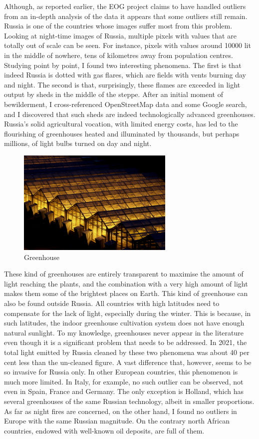 Although, as reported earlier, the EOG project claims to have handled outliers from an in-depth analysis of the data it appears that some outliers still remain. Russia is one of the countries whose images suffer most from this problem. Looking at night-time images of Russia, multiple pixels with values that are totally out of scale can be seen. For instance, pixels with values around 10000 lit in the middle of nowhere, tens of kilometres away from population centres.
Studying point by point, I found two interesting phenomena. The first is that indeed Russia is dotted with gas flares, which are fields with vents burning day and night. The second is that, surprisingly, these flames are exceeded in light output by sheds in the middle of the steppe. After an initial moment of bewilderment, I cross-referenced OpenStreetMap data and some Google search, and I discovered that such sheds are indeed technologically advanced greenhouses. Russia's solid agricultural vocation, with limited energy costs, has led to the flourishing of greenhouses heated and illuminated by thousands, but perhaps millions, of light bulbs turned on day and night. 
\begin{figure}
    \centering
    \includegraphics[width=7.5cm]{images/greenhousesatnight.jpg}
    \caption{Greenhouse}
    \label{fig:my_label}
\end{figure}
These kind of greenhouses are entirely transparent to maximise the amount of light reaching the plants, and the combination with a very high amount of light makes them some of the brightest places on Earth. This kind of greenhouse can also be found outside Russia. All countries with high latitudes need to compensate for the lack of light, especially during the winter. This is because, in such latitudes, the indoor greenhouse cultivation system does not have enough natural sunlight. To my knowledge, greenhouses never appear in the literature even though it is a significant problem that needs to be addressed. In 2021, the total light emitted by Russia cleaned by these two phenomena was about 40 per cent less than the un-cleaned figure. A vast difference that, however, seems to be so invasive for Russia only. In other European countries, this phenomenon is much more limited. In Italy, for example, no such outlier can be observed, not even in Spain, France and Germany. The only exception is Holland, which has several greenhouses of the same Russian technology, albeit in smaller proportions.
As far as night fires are concerned, on the other hand, I found no outliers in Europe with the same Russian magnitude. On the contrary north African countries, endowed with well-known oil deposits, are full of them. 

